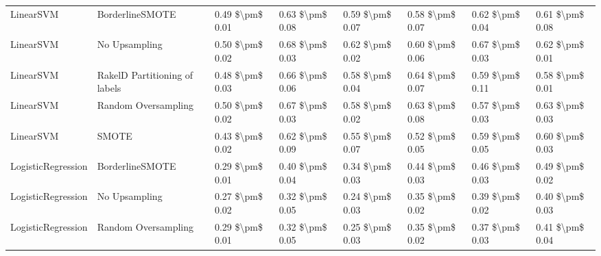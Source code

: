 \begin{tabular}{llllllll}
                      LinearSVM &               BorderlineSMOTE &     0.49 \$\textbackslash pm\$ 0.01 &           0.63 \$\textbackslash pm\$ 0.08 &       0.59 \$\textbackslash pm\$ 0.07 &        0.58 \$\textbackslash pm\$ 0.07 &                         0.62 \$\textbackslash pm\$ 0.04 & 0.61 \$\textbackslash pm\$ 0.08 \\
                      LinearSVM &                 No Upsampling &     0.50 \$\textbackslash pm\$ 0.02 &           0.68 \$\textbackslash pm\$ 0.03 &       0.62 \$\textbackslash pm\$ 0.02 &        0.60 \$\textbackslash pm\$ 0.06 &                         0.67 \$\textbackslash pm\$ 0.03 & 0.62 \$\textbackslash pm\$ 0.01 \\
                      LinearSVM & RakelD Partitioning of labels &     0.48 \$\textbackslash pm\$ 0.03 &           0.66 \$\textbackslash pm\$ 0.06 &       0.58 \$\textbackslash pm\$ 0.04 &        0.64 \$\textbackslash pm\$ 0.07 &                         0.59 \$\textbackslash pm\$ 0.11 & 0.58 \$\textbackslash pm\$ 0.01 \\
                      LinearSVM &           Random Oversampling &     0.50 \$\textbackslash pm\$ 0.02 &           0.67 \$\textbackslash pm\$ 0.03 &       0.58 \$\textbackslash pm\$ 0.02 &        0.63 \$\textbackslash pm\$ 0.08 &                         0.57 \$\textbackslash pm\$ 0.03 & 0.63 \$\textbackslash pm\$ 0.03 \\
                      LinearSVM &                         SMOTE &     0.43 \$\textbackslash pm\$ 0.02 &           0.62 \$\textbackslash pm\$ 0.09 &       0.55 \$\textbackslash pm\$ 0.07 &        0.52 \$\textbackslash pm\$ 0.05 &                         0.59 \$\textbackslash pm\$ 0.05 & 0.60 \$\textbackslash pm\$ 0.03 \\
             LogisticRegression &               BorderlineSMOTE &     0.29 \$\textbackslash pm\$ 0.01 &           0.40 \$\textbackslash pm\$ 0.04 &       0.34 \$\textbackslash pm\$ 0.03 &        0.44 \$\textbackslash pm\$ 0.03 &                         0.46 \$\textbackslash pm\$ 0.03 & 0.49 \$\textbackslash pm\$ 0.02 \\
             LogisticRegression &                 No Upsampling &     0.27 \$\textbackslash pm\$ 0.02 &           0.32 \$\textbackslash pm\$ 0.05 &       0.24 \$\textbackslash pm\$ 0.03 &        0.35 \$\textbackslash pm\$ 0.02 &                         0.39 \$\textbackslash pm\$ 0.02 & 0.40 \$\textbackslash pm\$ 0.03 \\
             LogisticRegression &           Random Oversampling &     0.29 \$\textbackslash pm\$ 0.01 &           0.32 \$\textbackslash pm\$ 0.05 &       0.25 \$\textbackslash pm\$ 0.03 &        0.35 \$\textbackslash pm\$ 0.02 &                         0.37 \$\textbackslash pm\$ 0.03 & 0.41 \$\textbackslash pm\$ 0.04 \\

\end{tabular}
